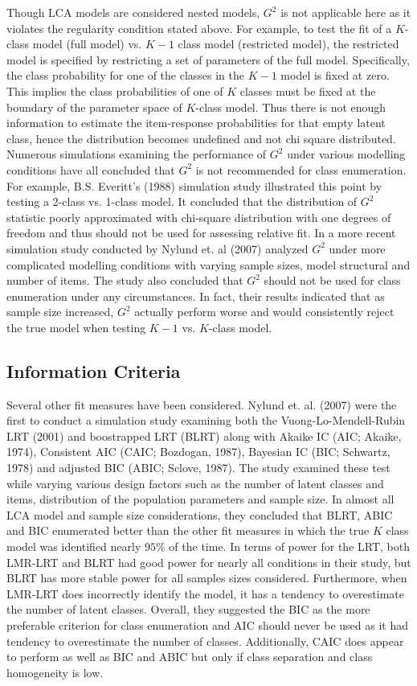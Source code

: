 Though LCA models are considered nested models, $G^2$ is not applicable here as it violates the regularity condition stated above. For example, to test the fit of a $K$-class model (full model) vs. $K-1$ class model (restricted model), the restricted model is specified by restricting a set of parameters of the full model. Specifically, the class probability for one of the classes in the $K-1$ model is fixed at zero. This implies the class probabilities of one of $K$ classes must be fixed at the boundary of the parameter space of $K$-class model. Thus there is not enough information to estimate the item-response probabilities for that empty latent class, hence the distribution becomes undefined and not chi square distributed. Numerous simulations examining the performance of $G^2$ under various modelling conditions have all concluded that $G^2$ is not recommended for class enumeration. For example, B.S. Everitt's (1988) simulation study illustrated this point by testing a 2-class vs. 1-class model. It concluded that the distribution of $G^2$ statistic poorly approximated with chi-square distribution with one degrees of freedom and thus should not be used for assessing relative fit. In a more recent simulation study conducted by Nylund et. al (2007) analyzed $G^2$ under more complicated modelling conditions with varying sample sizes, model structural and number of items. The study also concluded that $G^2$ should not be used for class enumeration under any circumstances. In fact, their results indicated that as sample size increased, $G^2$ actually perform worse and would consistently reject the true model when testing $K-1$ vs. $K$-class model. 

\subsection{Information Criteria}

Several other fit measures have been considered. Nylund et. al. (2007) were the first to conduct a simulation study examining both the Vuong-Lo-Mendell-Rubin LRT (2001) and boostrapped LRT (BLRT) along with Akaike IC (AIC; Akaike, 1974), Consistent AIC (CAIC; Bozdogan, 1987), Bayesian IC (BIC; Schwartz, 1978) and adjusted BIC (ABIC; Sclove, 1987). The study examined these test while varying various design factors such as the number of latent classes and items, distribution of the population parameters and sample size. In almost all LCA model and sample size considerations, they concluded that BLRT, ABIC and BIC enumerated better than the other fit measures in which the true $K$ class model was identified nearly $95\%$ of the time. In terms of power for the LRT, both LMR-LRT and BLRT had good power for nearly all conditions in their study, but BLRT has more stable power for all samples sizes considered. Furthermore, when LMR-LRT does incorrectly identify the model, it has a tendency to overestimate the number of latent classes. Overall, they suggested the BIC as the more preferable criterion for class enumeration and AIC should never be used as it had tendency to overestimate the number of classes. Additionally, CAIC does appear to perform as well as BIC and ABIC but only if class separation and class homogeneity is low.

